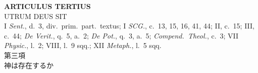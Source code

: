 \documentclass[paper=a4paper,fontsize=10pt,jafontsize=9pt,titlepage]{jlreq}
\begin{document}
\newpage
{}
{}
\setcounter{section}{3}
\setcounter{subsection}{0}
\begin{center}
 {\Large {\bfseries ARTICULUS TERTIUS}}\\
 {\large UTRUM DEUS SIT}\\
 {\footnotesize I {\itshape Sent.}, d.~3, div.~prim.~part.~textus; I {\itshape
 SCG.}, c.~13, 15, 16, 41, 44; II, c.~15; III, c.~44; {\itshape De Verit.},
 q.~5, a.~2; {\itshape De Pot.}, q.~3, a.~5; {\itshape Compend.~Theol.}, c.~3; VII
 {\itshape Physic.}, l.~2; VIII, l.~9 sqq.; XII {\itshape Metaph.}, l.~5 sqq.}\\
 {\Large 第三項\\神は存在するか}
\end{center}
\end{document}
